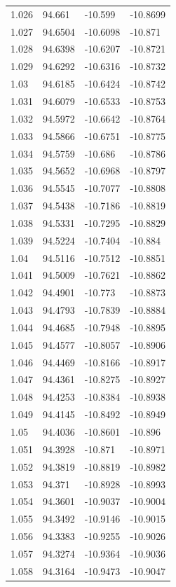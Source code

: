 \begin{tabular}{llll}
1.026 & 94.661 & -10.599 & -10.8699 \\
1.027 & 94.6504 & -10.6098 & -10.871 \\
1.028 & 94.6398 & -10.6207 & -10.8721 \\
1.029 & 94.6292 & -10.6316 & -10.8732 \\
1.03 & 94.6185 & -10.6424 & -10.8742 \\
1.031 & 94.6079 & -10.6533 & -10.8753 \\
1.032 & 94.5972 & -10.6642 & -10.8764 \\
1.033 & 94.5866 & -10.6751 & -10.8775 \\
1.034 & 94.5759 & -10.686 & -10.8786 \\
1.035 & 94.5652 & -10.6968 & -10.8797 \\
1.036 & 94.5545 & -10.7077 & -10.8808 \\
1.037 & 94.5438 & -10.7186 & -10.8819 \\
1.038 & 94.5331 & -10.7295 & -10.8829 \\
1.039 & 94.5224 & -10.7404 & -10.884 \\
1.04 & 94.5116 & -10.7512 & -10.8851 \\
1.041 & 94.5009 & -10.7621 & -10.8862 \\
1.042 & 94.4901 & -10.773 & -10.8873 \\
1.043 & 94.4793 & -10.7839 & -10.8884 \\
1.044 & 94.4685 & -10.7948 & -10.8895 \\
1.045 & 94.4577 & -10.8057 & -10.8906 \\
1.046 & 94.4469 & -10.8166 & -10.8917 \\
1.047 & 94.4361 & -10.8275 & -10.8927 \\
1.048 & 94.4253 & -10.8384 & -10.8938 \\
1.049 & 94.4145 & -10.8492 & -10.8949 \\
1.05 & 94.4036 & -10.8601 & -10.896 \\
1.051 & 94.3928 & -10.871 & -10.8971 \\
1.052 & 94.3819 & -10.8819 & -10.8982 \\
1.053 & 94.371 & -10.8928 & -10.8993 \\
1.054 & 94.3601 & -10.9037 & -10.9004 \\
1.055 & 94.3492 & -10.9146 & -10.9015 \\
1.056 & 94.3383 & -10.9255 & -10.9026 \\
1.057 & 94.3274 & -10.9364 & -10.9036 \\
1.058 & 94.3164 & -10.9473 & -10.9047 \\

\end{tabular}

